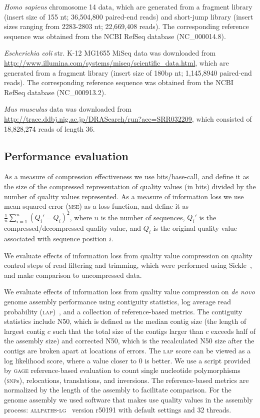 \documentclass{bioinfo}
\begin{document}
\begin{methods}
\textit{Homo sapiens} chromosome 14 data, which are generated from a
fragment library (insert size of 155 nt; 36,504,800 paired-end reads)
and short-jump library (insert sizes ranging from 2283-2803 nt;
22,669,408 reads). The corresponding reference sequence was obtained
from the NCBI RefSeq database (NC\_000014.8).

\textit{Escherichia coli} str. K-12 MG1655 MiSeq data was downloaded
from \url{http://www.illumina.com/systems/miseq/scientific_data.html},
which are generated from a fragment library (insert size of 180bp nt;
1,145,8940 paired-end reads). The corresponding reference sequence
was obtained from the NCBI RefSeq database (NC\_000913.2).

\textit{Mus musculus} data was downloaded from
\url{http://trace.ddbj.nig.ac.jp/DRASearch/run?acc=SRR032209}, which
consisted of 18,828,274 reads of length 36.

\subsection{Performance evaluation}

As a measure of compression effectiveness we use bits/base-call, and
define it as the size of the compressed representation of quality
values (in bits) divided by the number of quality values represented.
As a measure of information loss we use mean squared error
(\textsc{mse}) as a loss function, and define it as
$\frac{1}{n}\sum_{i=1}^{n}{(Q_i'-Q_i)^2}$, where $n$ is the number of
sequences, $Q_i'$ is the compressed/decompressed quality value, and
$Q_i$ is the original quality value associated with sequence position
$i$.

We evaluate effects of information loss from quality value compression
on quality control steps of read filtering and trimming, which were
performed using Sickle~\citep{sickle}, and make comparison to
uncompressed data.

We evaluate effects of information loss from quality value compression
on \emph{de novo} genome assembly performance using contiguity
statistics, log average read probability
(\textsc{lap})~\citep{Ghodsi:2013hb}, and a collection of
reference-based metrics. The contiguity statistics include N50, which is defined as the median contig
size (the length of largest contig $c$ such that the total size of the
contigs larger than $c$ exceeds half of the assembly size) and corrected N50, which is the recalculated N50 size after the contigs are broken apart at locations of errors. The
\textsc{lap} score can be viewed as a log likelihood score, where a
value closer to 0 is better. We use a script provided by \textsc{gage}
reference-based evaluation to count single nucleotide polymorphisms
(\textsc{snp}s), relocations, translations, and inversions. The
reference-based metrics are normalized by the length of the assembly
to facilitate comparison. For the genome assembly we used software
that makes use quality values in the assembly process:
\textsc{allpaths-lg}~\citep{Gnerre:2011kx} version r50191 with default
settings and 32 threads.

\end{methods}
\end{document}
